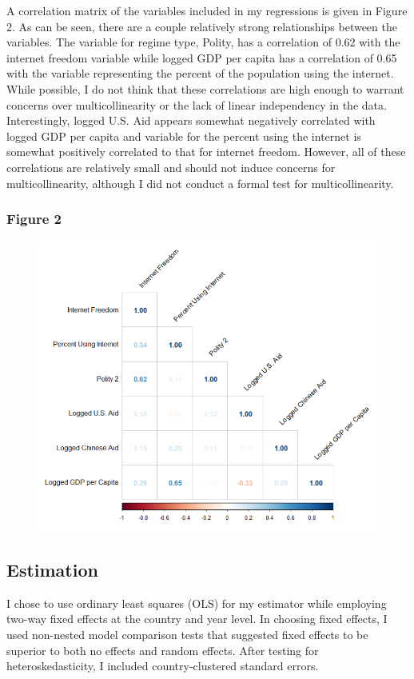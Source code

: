 \documentclass[12pt]{article}
\begin{document}
\pagebreak
A correlation matrix of the variables included in my regressions is given in Figure 2. As can be seen, there are a couple relatively strong relationships between the variables. The variable for regime type, Polity, has a correlation of 0.62 with the internet freedom variable while logged GDP per capita has a correlation of 0.65 with the variable representing the percent of the population using the internet. While possible, I do not think that these correlations are high enough to warrant concerns over multicollinearity or the lack of linear independency in the data. Interestingly, logged U.S. Aid appears somewhat negatively correlated with logged GDP per capita and variable for the percent using the internet is somewhat positively correlated to that for internet freedom. However, all of these correlations are relatively small and should not induce concerns for multicollinearity, although I did not conduct a formal test for multicollinearity.

\pagebreak
\subsubsection*{Figure 2}
\begin{figure}[htbp]
    \includegraphics[scale=0.7]{Figures/628plot3.png}
\end{figure}

\subsection*{Estimation}
I chose to use ordinary least squares (OLS) for my estimator while employing two-way fixed effects at the country and year level. In choosing fixed effects, I used non-nested model comparison tests that suggested fixed effects to be superior to both no effects and random effects. After testing for heteroskedasticity, I included country-clustered standard errors. %
\end{document}
